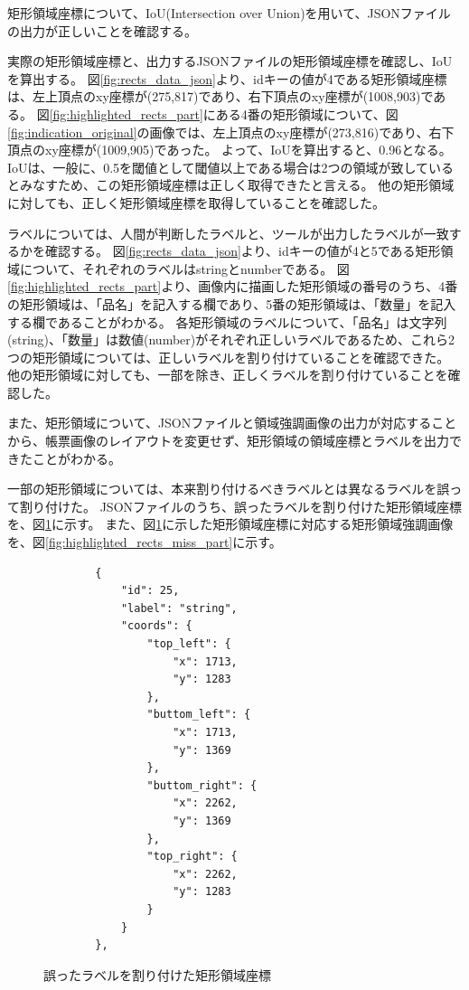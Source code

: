矩形領域座標について、IoU(Intersection over Union)を用いて、JSONファイルの出力が正しいことを確認する。

実際の矩形領域座標と、出力するJSONファイルの矩形領域座標を確認し、IoUを算出する。
図\ref{fig:rects_data_json}より、idキーの値が4である矩形領域座標は、左上頂点のxy座標が(275,817)であり、右下頂点のxy座標が(1008,903)である。
図\ref{fig:highlighted_rects_part}にある4番の矩形領域について、図\ref{fig:indication_original}の画像では、左上頂点のxy座標が(273,816)であり、右下頂点のxy座標が(1009,905)であった。
よって、IoUを算出すると、0.96となる。
IoUは、一般に、0.5を閾値として閾値以上である場合は2つの領域が致しているとみなすため、この矩形領域座標は正しく取得できたと言える。
他の矩形領域に対しても、正しく矩形領域座標を取得していることを確認した。

ラベルについては、人間が判断したラベルと、ツールが出力したラベルが一致するかを確認する。
図\ref{fig:rects_data_json}より、idキーの値が4と5である矩形領域について、それぞれのラベルはstringとnumberである。
図\ref{fig:highlighted_rects_part}より、画像内に描画した矩形領域の番号のうち、4番の矩形領域は、「品名」を記入する欄であり、5番の矩形領域は、「数量」を記入する欄であることがわかる。
各矩形領域のラベルについて、「品名」は文字列(string)、「数量」は数値(number)がそれぞれ正しいラベルであるため、これら2つの矩形領域については、正しいラベルを割り付けていることを確認できた。
他の矩形領域に対しても、一部を除き、正しくラベルを割り付けていることを確認した。

また、矩形領域について、JSONファイルと領域強調画像の出力が対応することから、帳票画像のレイアウトを変更せず、矩形領域の領域座標とラベルを出力できたことがわかる。

一部の矩形領域については、本来割り付けるべきラベルとは異なるラベルを誤って割り付けた。
JSONファイルのうち、誤ったラベルを割り付けた矩形領域座標を、図\ref{fig:rects_data_miss_json}に示す。
また、図\ref{fig:rects_data_miss_json}に示した矩形領域座標に対応する矩形領域強調画像を、図\ref{fig:highlighted_rects_miss_part}に示す。

\lstset{language=}
\begin{figure}[t]
    \begin{lstlisting}
        {
            "id": 25,
            "label": "string",
            "coords": {
                "top_left": {
                    "x": 1713,
                    "y": 1283
                },
                "buttom_left": {
                    "x": 1713,
                    "y": 1369
                },
                "buttom_right": {
                    "x": 2262,
                    "y": 1369
                },
                "top_right": {
                    "x": 2262,
                    "y": 1283
                }
            }
        },
    \end{lstlisting}
    \caption{誤ったラベルを割り付けた矩形領域座標}\label{fig:rects_data_miss_json}
\end{figure}

